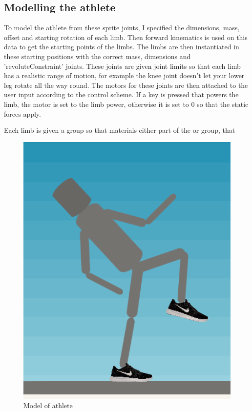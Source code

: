 \documentclass[12pt,a4paper,twoside,openright]{report}
\begin{document}
\subsection{Modelling the athlete}
\label{sec:athleteModel}
To model the athlete from these sprite joints, I specified the dimensions, mass, offset and starting rotation of each limb. Then forward kinematics is used on this data to get the starting points of the limbs. The limbs are then instantiated in these starting positions with the correct mass, dimensions and 'revoluteConstraint' joints. 
These joints are given joint limits so that each limb has a realistic range of motion, for example the knee joint doesn't let your lower leg rotate all the way round.
The motors for these joints are then attached to the user input according to the control scheme. If a key is pressed that powers the limb, the motor is set to the limb power, otherwise it is set to 0 so that the static forces apply.

Each limb is given a group so that materials 
either part of the  or  group, that 

\begin{figure}[tbh]
\centerline{\includegraphics[scale=0.5]{athleteModel.PNG}}
\caption{Model of athlete}
\label{athleteModel}
\end{figure}
\end{document}
